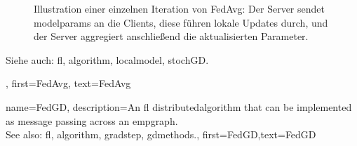 {{\begin{figure}[H]
\begin{center}
        \end{center}
        \caption{Illustration einer einzelnen Iteration von FedAvg: Der Server sendet \glspl{modelparam} an die Clients, 
        diese führen lokale Updates durch, und der Server aggregiert anschließend die aktualisierten Parameter. 
        \label{fig_single_iteration_fedavg_dict}} 
    \end{figure} 
    Siehe auch: \gls{fl}, \gls{algorithm}, \gls{localmodel}, \gls{stochGD}.},
    first={FedAvg},
    text={FedAvg}
}


{name={FedGD},
	description={An \gls{fl} \gls{distributedalgorithm} that 
		can be implemented as message passing across an \gls{empgraph}. 
		\\ 
		See also: \gls{fl}, \gls{algorithm}, \gls{gradstep}, \gls{gdmethods}.},
	first={FedGD},text={FedGD}
} 

